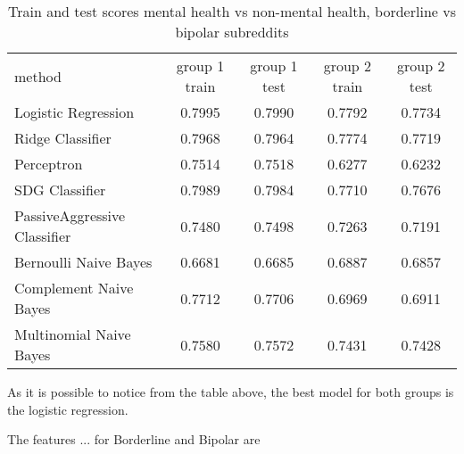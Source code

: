 \documentclass{article}
\begin{document}
\begin{table}[H]
	\scriptsize
	\centering
	\begin{tabular}{l|cccc}
		method 						& group 1 train & group 1 test  &  group 2 train &   group 2 test \\
		\noalign{\smallskip}\hline\noalign{\smallskip}
		Logistic Regression    		&	0.7995  	&	0.7990  	&	0.7792  	 &	0.7734\\
		Ridge Classifier   			&	0.7968  	&	0.7964 	 	&	0.7774  	 &	0.7719\\
		Perceptron   				&	0.7514  	&	0.7518  	&	0.6277  	 &	0.6232\\
		SDG Classifier    			&	0.7989  	&	0.7984  	&	0.7710   	 &	0.7676\\
		PassiveAggressive Classifier &	0.7480   	&	0.7498  	&	0.7263  	 &	0.7191\\
		Bernoulli Naive Bayes    	&	0.6681   	&	0.6685  	&	0.6887  	 &	0.6857\\
		Complement Naive Bayes    	&	0.7712  	&	0.7706  	&	0.6969  	 &	0.6911\\
		Multinomial Naive Bayes    	&	0.7580   	&	0.7572  	&	0.7431 		 &	0.7428
	\end{tabular}
	\caption {Train and test scores mental health vs non-mental health, borderline vs bipolar subreddits}
\end{table}


As it is possible to notice from the table above, the best model for both groups is the logistic regression. 

The features ... for Borderline and Bipolar are 





%
%


\end{document}
